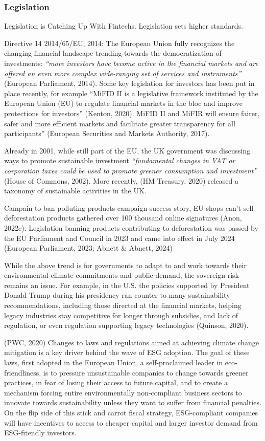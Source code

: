 \documentclass[
  letterpaper,
  DIV=11,
  numbers=noendperiod]{scrartcl}
\begin{document}
\subsubsection{Legislation}\label{legislation}

Legislation is Catching Up With Fintechs. Legislation sets higher
standards.

Directive 14 2014/65/EU, 2014: The European Union fully recognizes the
changing financial landscape trending towards the democratization of
investments: \emph{``more investors have become active in the financial
markets and are offered an even more complex wide-ranging set of
services and instruments''} (European Parliament, 2014). Some key
legislation for investors has been put in place recently, for example
``MiFID II is a legislative framework instituted by the European Union
(EU) to regulate financial markets in the bloc and improve protections
for investors'' (Kenton, 2020). MiFID II and MiFIR will ensure fairer,
safer and more efficient markets and facilitate greater transparency for
all participants'' (European Securities and Markets Authority, 2017).

Already in 2001, while still part of the EU, the UK government was
discussing ways to promote sustainable investment \emph{``fundamental
changes in VAT or corporation taxes could be used to promote greener
consumption and investment''} (House of Commons, 2002). More recently,
(HM Treasury, 2020) released a taxonomy of sustainable activities in the
UK.

Campain to ban polluting products campaign success story, EU shops can't
sell deforestation products gathered over 100 thousand online signatures
(Anon, 2022e). Legislation banning products contributing to
deforestation was passed by the EU Parliament and Council in 2023 and
came into effect in July 2024 (European Parliament, 2023; Abnett \&
Abnett, 2024)

While the above trend is for governments to adapt to and work towards
their environmental climate commitments and public demand, the sovereign
risk remains an issue. For example, in the U.S. the policies supported
by President Donald Trump during his presidency ran counter to many
sustainability recommendations, including those directed at the
financial markets, helping legacy industries stay competitive for longer
through subsidies, and lack of regulation, or even regulation supporting
legacy technologies (Quinson, 2020).

(PWC, 2020) Changes to laws and regulations aimed at achieving climate
change mitigation is a key driver behind the wave of ESG adoption. The
goal of these laws, first adopted in the European Union, a
self-proclaimed leader in eco-friendliness, is to pressure unsustainable
companies to change towards greener practices, in fear of losing their
access to future capital, and to create a mechanism forcing entire
environmentally non-compliant business sectors to innovate towards
sustainability unless they want to suffer from financial penalties. On
the flip side of this stick and carrot fiscal strategy, ESG-compliant
companies will have incentives to access to cheaper capital and larger
investor demand from ESG-friendly investors.
\end{document}
